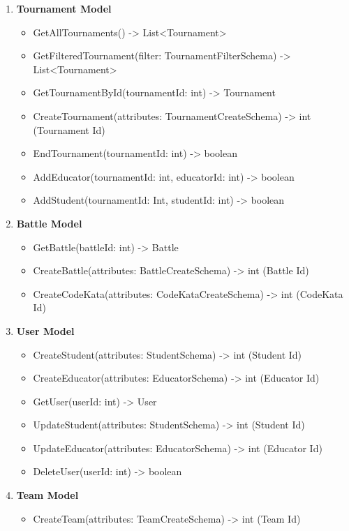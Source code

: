 \begin{enumerate}
    \item \textbf{Tournament Model}
    \begin{itemize}
        \item GetAllTournaments() -> List<Tournament> 
        \item GetFilteredTournament(filter: TournamentFilterSchema) -> List<Tournament>\\
        \item GetTournamentById(tournamentId: int) -> Tournament
        \item CreateTournament(attributes: TournamentCreateSchema) -> int (Tournament Id)
        \item EndTournament(tournamentId: int) -> boolean
        \item AddEducator(tournamentId: int, educatorId: int) -> boolean
        \item AddStudent(tournamentId: Int, studentId: int) -> boolean
    \end{itemize}  
    \item \textbf{Battle Model}
    \begin{itemize}
        \item GetBattle(battleId: int) -> Battle
        \item CreateBattle(attributes: BattleCreateSchema) -> int (Battle Id)
        \item CreateCodeKata(attributes: CodeKataCreateSchema) -> int (CodeKata Id)
    \end{itemize}
    \item \textbf{User Model}
    \begin{itemize}
        \item CreateStudent(attributes: StudentSchema) -> int (Student Id)
        \item CreateEducator(attributes: EducatorSchema) -> int (Educator Id)
        \item GetUser(userId: int) -> User
        \item UpdateStudent(attributes: StudentSchema) -> int (Student Id)
        \item UpdateEducator(attributes: EducatorSchema) -> int (Educator Id)
        \item DeleteUser(userId: int) -> boolean
    \end{itemize}
    \item \textbf{Team Model}
    \begin{itemize}
        \item CreateTeam(attributes: TeamCreateSchema) -> int (Team Id)

\end{itemize}
\end{enumerate}
